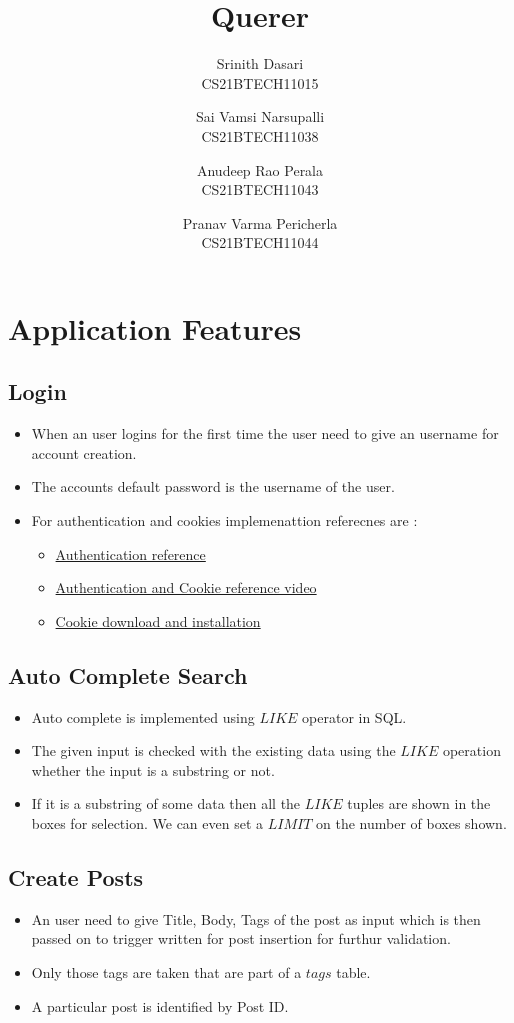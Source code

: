 \documentclass[12pt,a4paper]{article}
\title{Querer}
\author{ Srinith Dasari \\ CS21BTECH11015 \and Sai Vamsi Narsupalli \\ CS21BTECH11038 \and Anudeep Rao Perala\\ CS21BTECH11043\and Pranav Varma Pericherla \\ CS21BTECH11044 }
\date{}
\begin{document}
	\maketitle
	
	\tableofcontents
	\newpage
	
	\section{Application Features}
\subsection{Login}
\begin{itemize}
	\item When an user logins for the first time the user need to give an username for account creation. 
	\item The accounts default password is the username of the user.
	\item For authentication and cookies implemenattion referecnes are :
	\begin{itemize}
		\item \href{https://www.makeuseof.com/create-protected-route-in-react/#:~:text=Protected%20routes%20are%20routes%20that,securing%20certain%20routes%20or%20information}{Authentication reference}
		\item \href{https://www.youtube.com/watch?v=YPgMnugXBJo&t=794s}{Authentication and Cookie reference video}
		\item \href{https://github.com/js-cookie/js-cookie}{Cookie download and installation}
	\end{itemize}
\end{itemize}
\subsection{Auto Complete Search}
\begin{itemize}
	\item Auto complete is implemented using $LIKE$ operator in SQL.
	\item The given input is checked with the existing data using the $LIKE$ operation whether the input is a substring or not.
	\item If it is a substring of some data then all the $LIKE$ tuples are shown in the boxes for selection. We can even set a $LIMIT$ on the number of boxes shown.
\end{itemize}
\subsection{Create Posts}
\begin{itemize}
\item An user need to give Title, Body, Tags of the post as input which is then passed on to trigger written for post insertion for furthur validation.
\item Only those tags are taken that are part of a $tags$ table.
\item A particular post is identified by Post ID.
\end{itemize}
\end{document}
